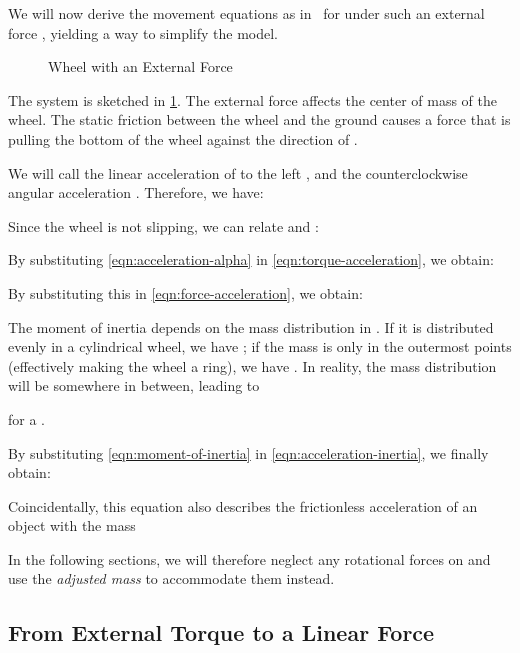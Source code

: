 \documentclass[copyright,submission]{eptcs}
\newcommand{\surface}{
    \begin{scope}[transparency group]
        \clip (-2,0) rectangle (2,-1);
        \draw[scope fading=south] (-2,0) rectangle (2,-1);
        \foreach \x in {-2,-1.75,...,3}
            \draw (\x,0) -- ();
    \end{scope}
}
\newcommand{\wheel}{
    \draw (0, 1) circle (1);
    \draw[fill] (0, 1) circle (0.05);
}
\begin{document}
We will now derive the movement equations as in~\cite{halliday2013fundamentals} for  under such an external force , yielding a way to simplify the model.

\begin{figure}[b]
    \centering{}
    \caption{\label{fig:wheel-with-force} Wheel  with an External Force }
\end{figure}

The system is sketched in \cref{fig:wheel-with-force}. The external force  affects the center of mass of the wheel. The static friction between the wheel and the ground causes a force  that is pulling the bottom of the wheel against the direction of .

We will call the linear acceleration of  to the left , and the counterclockwise angular acceleration . Therefore, we have:


Since the wheel is not slipping, we can relate  and :


By substituting \cref{eqn:acceleration-alpha} in \cref{eqn:torque-acceleration}, we obtain:


By substituting this in \cref{eqn:force-acceleration}, we obtain:


The moment of inertia  depends on the mass distribution in . If it is distributed evenly in a cylindrical wheel, we have ; if the mass is only in the outermost points (effectively making the wheel a ring), we have . In reality, the mass distribution will be somewhere in between, leading to

for a .

By substituting \cref{eqn:moment-of-inertia} in \cref{eqn:acceleration-inertia}, we finally obtain:


Coincidentally, this equation also describes the frictionless acceleration of an object with the mass


In the following sections, we will therefore neglect any rotational forces on  and use the \emph{adjusted mass}  to accommodate them instead.


\subsection{From External Torque to a Linear Force}
\end{document}
